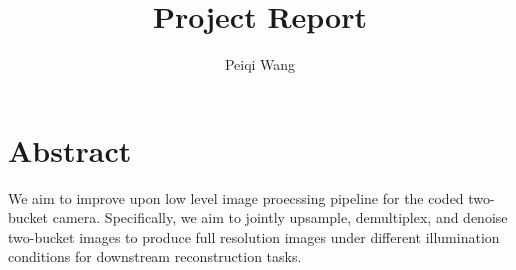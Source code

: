 \documentclass[11pt]{article}
\title{Project Report}
\author{Peiqi Wang}
\begin{document}
\maketitle
\newpage 
\tableofcontents
\newpage


\section{Abstract}
We aim to improve upon low level image proecssing pipeline for the coded two-bucket camera. Specifically, we aim to jointly upsample, demultiplex, and denoise two-bucket images to produce full resolution images under different illumination conditions for downstream reconstruction tasks.






\newpage
\printbibliography
\end{document}
